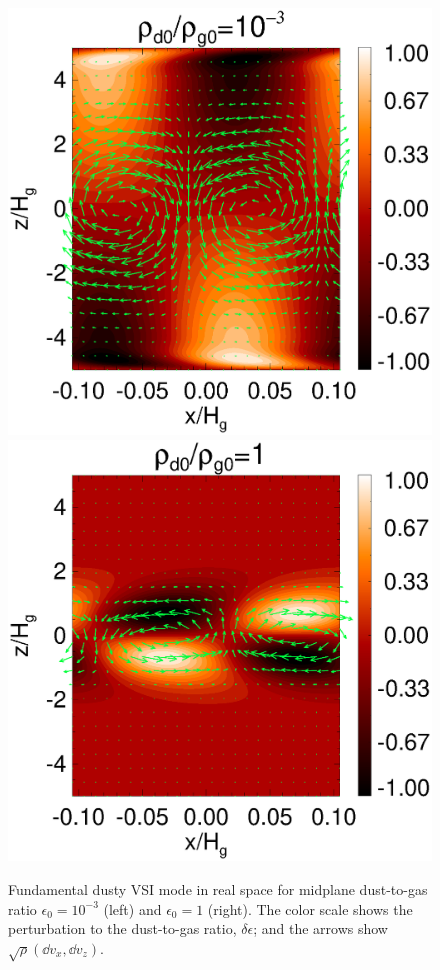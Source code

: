 \begin{figure}
\includegraphics[scale=0.32, clip=true, trim=0.5cm 0cm 3cm 0cm]{figures/result2d_dg1d-3.ps}\includegraphics[scale=0.32, clip=true, trim=1.8cm 0cm 0cm 0cm]{figures/result2d_dg1.ps}
  \caption{Fundamental dusty VSI mode in real space for midplane dust-to-gas
    ratio $\epsilon_0=10^{-3}$ (left) and $\epsilon_0=1$
    (right). The color scale shows the perturbation to the
    dust-to-gas ratio, $\delta\epsilon$; and the arrows show
    $\sqrt{\rho}\left(\dd v_x, \dd v_z\right)$. 
    \label{vsi_dust_loading2d}
    }
\end{figure}






